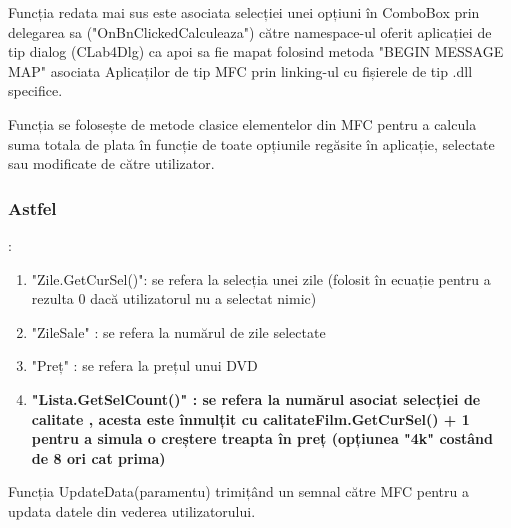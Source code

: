 \documentclass{amsart}
\begin{document}
Funcția redata mai sus este asociata selecției unei opțiuni în ComboBox prin delegarea sa ("OnBnClickedCalculeaza") către namespace-ul oferit aplicației de tip dialog (CLab4Dlg) ca apoi sa fie mapat folosind metoda "BEGIN MESSAGE MAP" asociata Aplicaților de tip MFC prin linking-ul cu fișierele  de tip .dll specifice.

\hfill \newline

Funcția se folosește de metode clasice elementelor din MFC pentru a calcula suma totala de plata în funcție de toate opțiunile regăsite în aplicație, selectate sau modificate de către utilizator. 

\hfill \newline

\subsubsection{Astfel} : 
\hfill \newline

\begin{enumerate}[label=\arabic*.]
\item "Zile.GetCurSel()": se refera la selecția unei zile (folosit în ecuație pentru a  rezulta 0 dacă utilizatorul nu a selectat nimic)
\hfill \newline

\item "ZileSale" : se refera la numărul de zile selectate
\hfill \newline

\item "Preț" : se refera la prețul unui DVD
\hfill \newline

\item \textbf{ "Lista.GetSelCount()" : se refera la numărul asociat selecției de calitate , acesta este înmulțit cu   calitateFilm.GetCurSel() + 1  
pentru a simula o creștere treapta în preț (opțiunea "4k" costând de 8 ori cat prima)}

\end{enumerate}

\hfill \newline
Funcția UpdateData(paramentu) trimițând un semnal către MFC pentru a updata datele din vederea utilizatorului.





\newpage

\newpage
\hfill \newline
\hfill \newline
\end{document}
